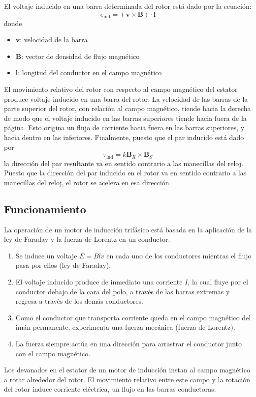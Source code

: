 \documentclass[a4paper,12pt]{article}
\newcommand{\mrm}{\mathrm}
\begin{document}
El voltaje inducido en una barra determinada del rotor está dado por la ecuación:
\begin{equation}
    e_{\mrm{ind}} = (\mathbf{v} \times \mathbf{B}) \cdot \mathbf{l}
\end{equation}
donde
\begin{itemize}
    \item $\mathbf{v}$: velocidad de la barra
    \item $\mathbf{B}$: vector de densidad de flujo magnético
    \item $\mathbf{l}$: longitud del conductor en el campo magnético
\end{itemize}
El movimiento relativo del rotor con respecto al campo magnético del estator produce voltaje inducido en una barra del rotor. La velocidad de las barras de la parte superior del rotor, con relación al campo magnético, tiende hacia la derecha de modo que el voltaje inducido en las barras superiores tiende hacia fuera de la página. Esto origina un flujo de corriente hacia fuera en las barras superiores, y hacia dentro en las inferiores. Finalmente, puesto que el par inducido está dado por
\begin{equation}
    \tau_{\mrm{ind}} = k\mathbf{B}_{R} \times \mathbf{B}_{S}
\end{equation}
la dirección del par resultante va en sentido contrario a las manecillas del reloj. Puesto que la dirección del par inducido en el rotor va en sentido contrario a las manecillas del reloj, el rotor se acelera en esa dirección.
\subsection{Funcionamiento}
La operación de un motor de inducción trifásico está basada en la aplicación de la ley de Faraday y la fuerza de Lorentz en un conductor.
\begin{enumerate}
    \item Se induce un voltaje $E = Blv$ en cada uno de los conductores mientras el flujo pasa por ellos (ley de Faraday).
    \item El voltaje inducido produce de inmediato una corriente $I$, la cual fluye por el conductor debajo de la cara del polo, a través de las barras extremas y regresa a través de los demás conductores.
    \item Como el conductor que transporta corriente queda en el campo magnético del imán permanente, experimenta una fuerza mecánica (fuerza de Lorentz).
    \item La fuerza siempre actúa en una dirección para arrastrar el conductor junto con el campo magnético.
\end{enumerate}
Los devanados en el estator de un motor de inducción instan al campo magnético a rotar alrededor del rotor. El movimiento relativo entre este campo y la rotación del rotor induce corriente eléctrica, un flujo en las barras conductoras.
\end{document}
